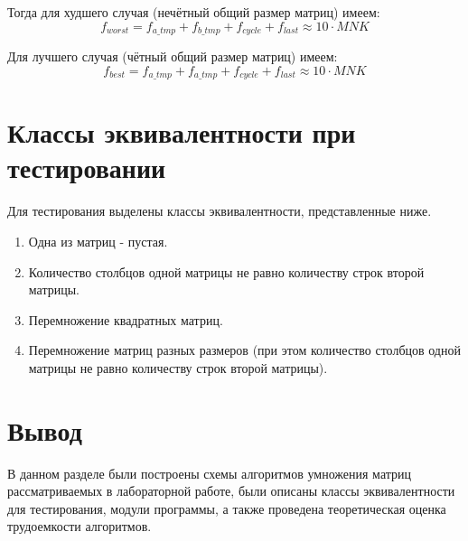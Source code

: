 Тогда для худшего случая (нечётный общий размер матриц) имеем:
\begin{equation}
	\label{for:bad_impr}
	f_{worst} =  f_{a\_tmp} + f_{b\_tmp} + f_{cycle} + f_{last}\approx 10 \cdot MNK
\end{equation}

Для лучшего случая (чётный общий размер матриц) имеем:
\begin{equation}
	\label{for:good_impr}
	f_{best} =  f_{a\_tmp} + f_{a\_tmp} + f_{cycle} + f_{last} \approx 10 \cdot MNK
\end{equation}



\section{Классы эквивалентности при тестировании}

Для тестирования выделены классы эквивалентности, представленные ниже.

\begin{enumerate}
	\item Одна из матриц - пустая.
	\item Количество столбцов одной матрицы не равно количеству строк второй матрицы.
	\item Перемножение квадратных матриц.
	\item Перемножение матриц разных размеров (при этом количество столбцов одной матрицы не равно количеству строк второй матрицы).
\end{enumerate}


\section{Вывод}

В данном разделе были построены схемы алгоритмов умножения матриц рассматриваемых в лабораторной работе, были описаны классы эквивалентности для тестирования, модули программы, а также проведена теоретическая оценка трудоемкости алгоритмов.
